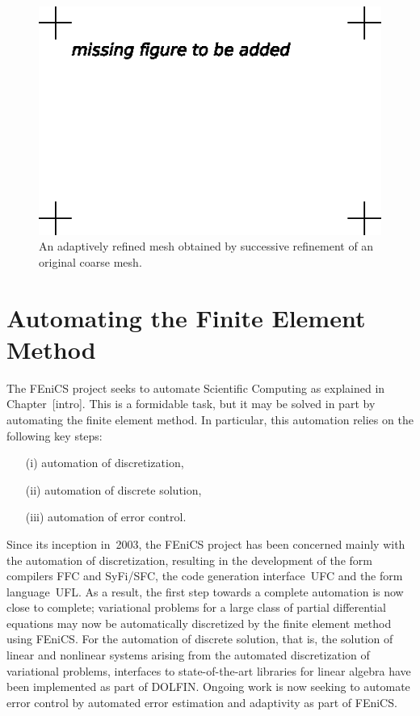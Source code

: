 \begin{figure}
  \begin{center}
    \includegraphics[width=\largewidth]{chapters/kirby-7/eps/missing-figure.eps}
    \caption{An adaptively refined mesh obtained by successive
      refinement of an original coarse mesh.}
    \label{fig:refinement}
  \end{center}
\end{figure}

\section{Automating the Finite Element Method}

The FEniCS project seeks to automate Scientific Computing as explained
in Chapter~[intro]. This is a formidable task, but it may be solved in
part by automating the finite element method. In particular, this
automation relies on the following key steps:
\begin{itemize}
\item[(i)]
  automation of discretization,
\item[(ii)]
  automation of discrete solution,
\item[(iii)]
  automation of error control.
\end{itemize}
Since its inception in~2003, the FEniCS project has been concerned
mainly with the automation of discretization, resulting in the
development of the form compilers FFC and SyFi/SFC, the code
generation interface~UFC and the form language~UFL. As a result, the
first step towards a complete automation is now close to complete;
variational problems for a large class of partial differential
equations may now be automatically discretized by the finite element
method using FEniCS. For the automation of discrete solution, that is,
the solution of linear and nonlinear systems arising from the
automated discretization of variational problems, interfaces to
state-of-the-art libraries for linear algebra have been implemented as
part of DOLFIN. Ongoing work is now seeking to automate error control
by automated error estimation and adaptivity as part of FEniCS.

